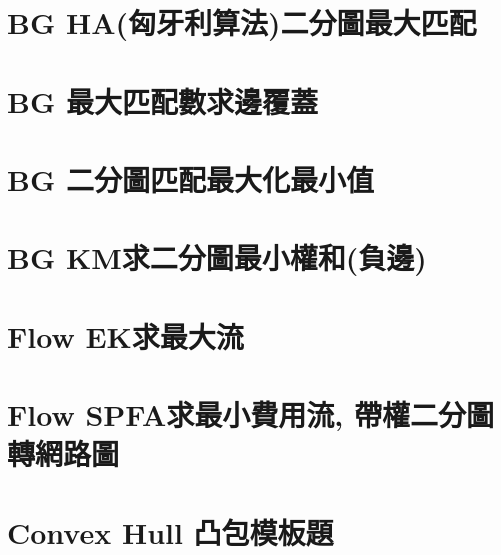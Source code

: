 \documentclass{article}
\begin{document}
\begin{multicols}{2}
\section{BG HA(匈牙利算法)二分圖最大匹配}



\section{BG 最大匹配數求邊覆蓋}



\section{BG 二分圖匹配最大化最小值}



\section{BG KM求二分圖最小權和(負邊)}



\section{Flow EK求最大流}



\section{Flow SPFA求最小費用流, 帶權二分圖轉網路圖}



\section{Convex Hull 凸包模板題}



\end{multicols}
\end{document}
